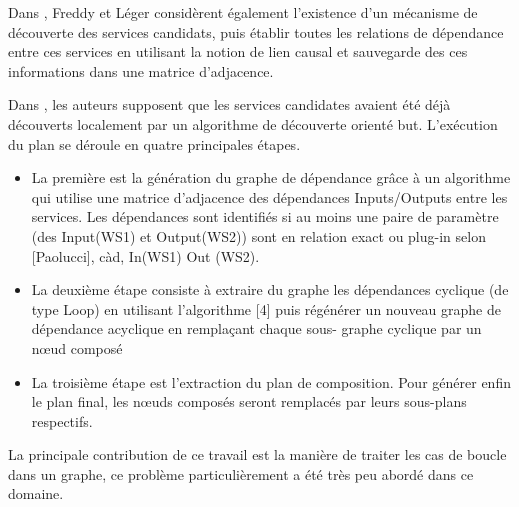   \begin{text}
    Dans \cite{lecue2006formal}, Freddy et Léger considèrent également
    l'existence d'un mécanisme de découverte des services candidats,
    puis établir toutes les relations de dépendance entre ces services
    en utilisant la notion de lien causal et sauvegarde des ces
    informations dans une matrice d'adjacence.

  \end{text}

  \begin{text}
    Dans \cite{omer2009dependency}, les auteurs supposent que les
    services candidates avaient été déjà découverts localement par un
    algorithme de découverte orienté but. L'exécution du plan se déroule
    en quatre principales étapes.

    \SpecialItem
    \begin{itemize}
    \item La première est la génération du graphe de dépendance grâce à
      un algorithme qui utilise une matrice d'adjacence des dépendances
      Inputs/Outputs entre les services. Les dépendances sont identifiés
      si au moins une paire de paramètre (des Input(WS1) et Output(WS2))
      sont en relation exact ou plug-in selon [Paolucci], càd, In(WS1)
      Out (WS2).

    \item La deuxième étape consiste à extraire du graphe les
      dépendances cyclique (de type Loop) en utilisant l'algorithme [4]
      puis régénérer un nouveau graphe de dépendance acyclique en
      remplaçant chaque sous- graphe cyclique par un nœud composé

    \item La troisième étape est l'extraction du plan de
      composition. Pour générer enfin le plan final, les nœuds composés
      seront remplacés par leurs sous-plans respectifs.
    \end{itemize}

    La principale contribution de ce travail est la manière de traiter
    les cas de boucle dans un graphe, ce problème particulièrement a été
    très peu abordé dans ce domaine.
  \end{text}

